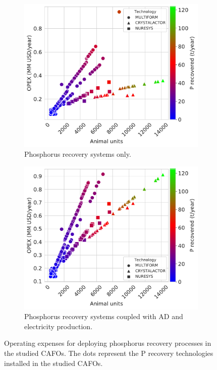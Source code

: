 \documentclass[authoryear]{elsarticle}
\begin{document}
\begin{figure}[H]
	\begin{subfigure}[t]{0.48\linewidth}
		\includegraphics[width=\linewidth]{Amortized_TechSelected_Pcredits22_REC0.pdf} 
		\caption{Phosphorus recovery systems only.}
		\label{fig:OPEX_TechSelected_Pcredits22_REC0}
	\end{subfigure}
	\quad
	\begin{subfigure}[t]{0.48\linewidth}
		\includegraphics[width=\linewidth]{Amortized_TechSelected_Pcredits22_REC60.pdf}
		\caption{Phosphorus recovery systems coupled with AD and electricity production.}
		\label{fig:OPEX_TechSelected_Pcredits22_REC60}
	\end{subfigure}
	
	\caption{Operating expenses for deploying phosphorus recovery processes in the studied CAFOs. The dots represent the P recovery technologies installed in the studied CAFOs.}
	\label{fig:OPEX_TechSelected}
\end{figure}
\end{document}
